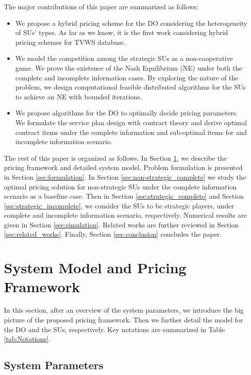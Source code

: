 \documentclass[journal]{IEEEtran}
\begin{document}
The major contributions of this paper are summarized as follows:
\begin{itemize}
  \item We propose a hybrid pricing scheme for the DO considering the heterogeneity of SUs' types. As far as we know, it is the first work considering hybrid pricing schemes for TVWS database.
  \item We model the competition among the strategic SUs as a non-cooperative game. We prove the existence of the Nash Equilibrium (NE) under both the complete and incomplete information cases. By exploring the nature of the problem, we design computational feasible distributed algorithms for the SUs to achieve an NE with bounded iterations.
  \item We propose algorithms for the DO to optimally decide pricing parameters. We formulate the service plan design with contract theory and derive optimal contract items under the complete information and sub-optimal items for and incomplete information scenario.
\end{itemize}

The rest of this paper is organized as follows. In Section \ref{sec:model}, we describe the pricing framework and detailed system model. Problem formulation is presented in Section \ref{sec:formulation}. In Section \ref{sec:non-strategic_complete} we study the optimal pricing solution for non-strategic SUs under the complete information scenario as a baseline case. Then in Section \ref{sec:strategic_complete} and Section \ref{sec:strategic_incomplete}, we consider the SUs to be strategic players, under complete and incomplete information scenario, respectively. Numerical results are given in Section \ref{sec:simulation}. Related works are further reviewed in Section \ref{sec:related_works}. Finally, Section \ref{sec:conclusion} concludes the paper.

\section{System Model and Pricing Framework}
\label{sec:model}

In this section, after an overview of the system parameters, we introduce the big picture of the proposed pricing framework. Then we further detail the model for the DO and the SUs, respectively.
Key notations are summarized in Table \ref{tab:Notations}.

\subsection{System Parameters}
\label{subsec:parameter}
\end{document}
